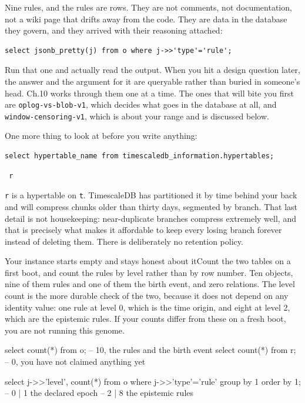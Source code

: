 Nine rules, and the rules are rows. They are not comments, not documentation, not a wiki page that drifts away from the code. They are data in the database they govern, and they arrived with their reasoning attached:

\begin{verbatim}
select jsonb_pretty(j) from o where j->>'type'='rule';
\end{verbatim}

Run that one and actually read the output. When you hit a design question later, the answer and the argument for it are queryable rather than buried in someone's head. Ch.10 works through them one at a time. The ones that will bite you first are \verb|oplog-vs-blob-v1|, which decides what goes in the database at all, and \verb|window-censoring-v1|, which is about your \labRun{} range and is discussed below.

One more thing to look at before you write anything:

\begin{verbatim}
select hypertable_name from timescaledb_information.hypertables;
\end{verbatim}

\begin{verbatim}
 r
\end{verbatim}

\verb|r| is a hypertable on \verb|t|. TimescaleDB has partitioned it by time behind your back and will compress chunks older than thirty days, segmented by branch. That last detail is not housekeeping: near-duplicate branches compress extremely well, and that is precisely what makes it affordable to keep every losing branch forever instead of deleting them. There is deliberately no retention policy.

\begin{Correspondence}{Your instance starts empty and stays honest about it}{Count the two tables on a first boot, and count the rules by level rather than by row number.}
Ten objects, nine of them rules and one of them the birth event, and zero relations. The level count is the more durable check of the two, because it does not depend on any identity value: one rule at level 0, which is the time origin, and eight at level 2, which are the epistemic rules. If your counts differ from these on a fresh boot, you are not running this genome.
\begin{Check}
select count(*) from o;              -- 10, the rules and the birth event
select count(*) from r;              -- 0, you have not claimed anything yet

select j->>'level', count(*) from o
 where j->>'type'='rule' group by 1 order by 1;
                                     -- 0 | 1   the declared epoch
                                     -- 2 | 8   the epistemic rules
\end{Check}
\end{Correspondence}

